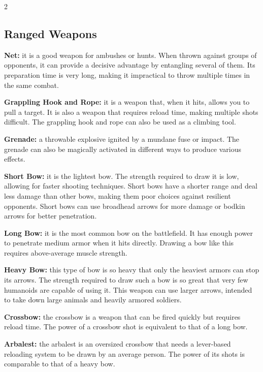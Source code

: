 \begin{multicols}{2}

\subsection{Ranged Weapons}

\textbf{Net:} it is a good weapon for ambushes or hunts. When thrown against groups of opponents, it can provide a decisive advantage by entangling several of them. Its preparation time is very long, making it impractical to throw multiple times in the same combat.

\textbf{Grappling Hook and Rope:} it is a weapon that, when it hits, allows you to pull a target. It is also a weapon that requires reload time, making multiple shots difficult. The grappling hook and rope can also be used as a climbing tool.

\textbf{Grenade:} a throwable explosive ignited by a mundane fuse or impact. \magic The grenade can also be magically activated in different ways to produce various effects.

\textbf{Short Bow:} it is the lightest bow. The strength required to draw it is low, allowing for faster shooting techniques. Short bows have a shorter range and deal less damage than other bows, making them poor choices against resilient opponents. Short bows can use broadhead arrows for more damage or bodkin arrows for better penetration.

\textbf{Long Bow:} it is the most common bow on the battlefield. It has enough power to penetrate medium armor when it hits directly. Drawing a bow like this requires above-average muscle strength.

\textbf{Heavy Bow:} this type of bow is so heavy that only the heaviest armors can stop its arrows. The strength required to draw such a bow is so great that very few humanoids are capable of using it. This weapon can use larger arrows, intended to take down large animals and heavily armored soldiers.

\textbf{Crossbow:} the crossbow is a weapon that can be fired quickly but requires reload time. The power of a crossbow shot is equivalent to that of a long bow.

\textbf{Arbalest:} the arbalest is an oversized crossbow that needs a lever-based reloading system to be drawn by an average person. The power of its shots is comparable to that of a heavy bow.

\end{multicols}

